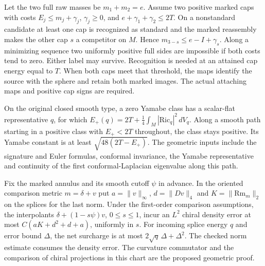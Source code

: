 \begin{proposition}
\label{prop:master-nonsplitting}
Let the two full raw masses be \(m_1+m_2=e\). Assume two positive
marked caps with costs \(E_j\le m_j+\gamma_j\), \(\gamma_j\ge0\), and
\(e+\gamma_1+\gamma_2\le 2T\). On a nonstandard candidate at least one
cap is recognized as standard and the marked reassembly makes the other
cap \(s\) a competitor on \(M\). Hence \(m_{3-s}\le e-I+\gamma_s\).
Along a minimizing sequence two uniformly positive full sides are
impossible if both costs tend to zero. Either label may survive.
Recognition is needed at an attained cap energy equal to \(T\). When both
caps meet that threshold, the maps identify the source with the sphere
and retain both marked images. The actual attaching maps and positive
cap signs are required.
\end{proposition}

\begin{lemma}
\label{lem:master-wall}
On the original closed smooth type, a zero Yamabe class has a
scalar-flat representative \(q\), for which
\(E_+(q)=2T+\frac14\int_M|\mathrm{Ric}_q|^2\,dV_q\).
Along a smooth path starting in a positive class with \(E_+<2T\)
throughout, the class stays positive. Its Yamabe constant is at least
\(\sqrt{48(2T-E_+)}\). The geometric inputs include the signature and
Euler formulas, conformal invariance, the Yamabe representative and
continuity of the first conformal-Laplacian eigenvalue along this path.
\end{lemma}

\begin{lemma}
\label{lem:master-splice}
Fix the marked annulus and its smooth cutoff \(\psi\) in advance. In the
oriented comparison metric \(m=\delta+v\) put \(a=\|v\|_\infty\),
\(d=\|Dv\|_4\) and \(K=\|\mathrm{Rm}_m\|_{2}\) on the splices for the last
norm. Under the first-order comparison assumptions, the interpolants
\(\delta+(1-s\psi)v\), \(0\le s\le1\), incur an \(L^2\) chiral density
error at most \(C(aK+d^2+d+a)\), uniformly in \(s\). For incoming
splice energy \(q\) and error bound \(\Delta\), the net surcharge is at
most \(2\sqrt q\,\Delta+\Delta^2\). The checked norm estimate consumes
the density error. The curvature commutator and the comparison of chiral
projections in this chart are the proposed geometric proof.
\end{lemma}

